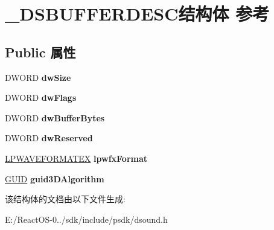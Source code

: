 \hypertarget{struct___d_s_b_u_f_f_e_r_d_e_s_c}{}\section{\+\_\+\+D\+S\+B\+U\+F\+F\+E\+R\+D\+E\+S\+C结构体 参考}
\label{struct___d_s_b_u_f_f_e_r_d_e_s_c}
\subsection*{Public 属性}
\begin{DoxyCompactItemize}
\item 
\mbox{\label{struct___d_s_b_u_f_f_e_r_d_e_s_c_a2ca872d44a4b06774d9971d12deecea7}} 
D\+W\+O\+RD {\bfseries dw\+Size}
\item 
\mbox{\label{struct___d_s_b_u_f_f_e_r_d_e_s_c_a6559b8fa8887250fcad280ddb2ce4691}} 
D\+W\+O\+RD {\bfseries dw\+Flags}
\item 
\mbox{\label{struct___d_s_b_u_f_f_e_r_d_e_s_c_ab5c1aa1b02d6d0f180f1d94de4f25de3}} 
D\+W\+O\+RD {\bfseries dw\+Buffer\+Bytes}
\item 
\mbox{\label{struct___d_s_b_u_f_f_e_r_d_e_s_c_af3db412468c7b66da7be8e3ea9b9ffb6}} 
D\+W\+O\+RD {\bfseries dw\+Reserved}
\item 
\mbox{\label{struct___d_s_b_u_f_f_e_r_d_e_s_c_affcad592af32c7abfd9776445ee59894}} 
\hyperlink{struct___w_a_v_e_f_o_r_m_a_t_e_x}{L\+P\+W\+A\+V\+E\+F\+O\+R\+M\+A\+T\+EX} {\bfseries lpwfx\+Format}
\item 
\mbox{\label{struct___d_s_b_u_f_f_e_r_d_e_s_c_a9b687752e00b07fe987dad1e8e1ba767}} 
\hyperlink{interface_g_u_i_d}{G\+U\+ID} {\bfseries guid3\+D\+Algorithm}
\end{DoxyCompactItemize}


该结构体的文档由以下文件生成\+:\begin{DoxyCompactItemize}
\item 
E\+:/\+React\+O\+S-\/0../sdk/include/psdk/dsound.\+h\end{DoxyCompactItemize}
